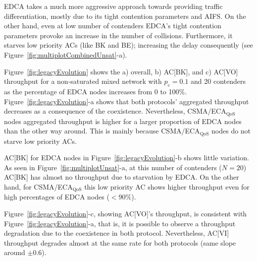 

EDCA takes a much more aggressive approach towards providing traffic differentiation, mostly due to its tight contention parameters and AIFS. On the other hand, even at low number of contenders EDCA's tight contention parameters provoke an increase in the number of collisions. Furthermore, it starves low priority ACs (like BK and BE); increasing the delay consequently (see Figure~\ref{fig:multiplotCombinedUnsat}-a).

Figure~\ref{fig:legacyEvolution} shows the a) overall, b) AC[BK], and c) AC[VO] throughput for a non-saturated mixed network with $p_e=0.1$ and 20 contenders as the percentage of EDCA nodes increases from 0 to 100\%. Figure~\ref{fig:legacyEvolution}-a shows that both protocols' aggregated throughput decreases as a consequence of the coexistence. Nevertheless, CSMA/ECA$_{\text{QoS}}$ nodes aggregated throughput is higher for a larger proportion of EDCA nodes than the other way around. This is mainly because CSMA/ECA$_{\text{QoS}}$ nodes do not starve low priority ACs.

AC[BK] for EDCA nodes in Figure~\ref{fig:legacyEvolution}-b shows little variation. As seen in Figure~\ref{fig:multiplotUnsat}-a, at this number of contenders ($N=20$) AC[BK] has almost no throughput due to starvation by EDCA. On the other hand, for CSMA/ECA$_{\text{QoS}}$ this low priority AC shows higher throughput even for high percentages of EDCA nodes ($<90\%$).

Figure~\ref{fig:legacyEvolution}-c, showing AC[VO]'s throughput, is consistent with Figure~\ref{fig:legacyEvolution}-a, that is, it is possible to observe a throughput degradation due to the coexistence in both protocol. Nevertheless, AC[VI] throughput degrades almost at the same rate for both protocols (same slope around $\pm 0.6$).

